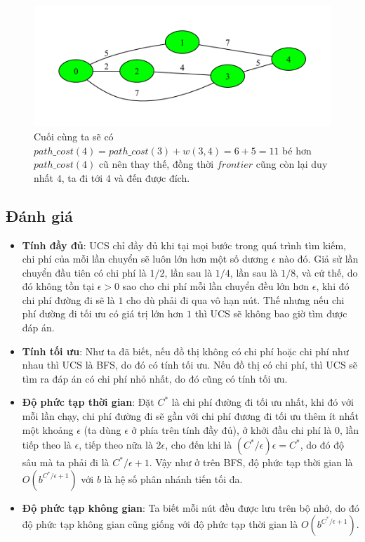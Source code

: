 \begin{figure}[H]
    \centering
    \includegraphics[scale=0.7]{figure/UCS/5.pdf}
    \caption{Cuối cùng ta sẽ có $path\_cost(4) = path\_cost(3) + w(3, 4) = 6 + 5 = 11$ bé hơn $path\_cost(4)$ cũ nên thay thế, đồng thời $frontier$ cũng còn lại duy nhất $4$, ta đi tới $4$ và đến được đích.}
    \label{fig:UCS_5}
\end{figure}

\subsection{Đánh giá}

\begin{itemize}
    \item \textbf{Tính đầy đủ}: UCS chỉ đầy đủ khi tại mọi bước trong quá trình tìm kiếm, chi phí của mỗi lần chuyển sẽ luôn lớn hơn một số dương $\epsilon$ nào đó. Giả sử lần chuyển đầu tiên có chi phí là $1/2$, lần sau là $1/4$, lần sau là $1/8$, và cứ thế, do đó không tồn tại $\epsilon > 0$ sao cho chi phí mỗi lần chuyển đều lớn hơn $\epsilon$, khi đó chi phí đường đi sẽ là $1$ cho dù phải đi qua vô hạn nút. Thế nhưng nếu chi phí đường đi tối ưu có giá trị lớn hơn $1$ thì UCS sẽ không bao giờ tìm được đáp án.

    \item \textbf{Tính tối ưu}: Như ta đã biết, nếu đồ thị không có chi phí hoặc chi phí như nhau thì UCS là BFS, do đó có tính tối ưu. Nếu đồ thị có chi phí, thì UCS sẽ tìm ra đáp án có chi phí nhỏ nhất, do đó cũng có tính tối ưu.

    \item \textbf{Độ phức tạp thời gian}: Đặt $C^*$ là chi phí đường đi tối ưu nhất, khi đó với mỗi lần chạy, chi phí đường đi sẽ gần với chi phí đương đi tối ưu thêm ít nhất một khoảng $\epsilon$ (ta dùng $\epsilon$ ở phía trên tính đầy đủ), ở khởi đầu chi phí là $0$, lần tiếp theo là $\epsilon$, tiếp theo nữa là $2\epsilon$, cho đến khi là $(C^*/\epsilon)\epsilon = C^*$, do đó độ sâu mà ta phải đi là $C^*/\epsilon + 1$. Vậy như ở trên BFS, độ phức tạp thời gian là $O(b^{C^*/\epsilon + 1})$ với $b$ là hệ số phân nhánh tiến tối đa.

    \item \textbf{Độ phức tạp không gian}: Ta biết mỗi nút đều được lưu trên bộ nhớ, do đó độ phức tạp không gian cũng giống với độ phức tạp thời gian là $O(b^{C^*/\epsilon + 1})$.
\end{itemize}


